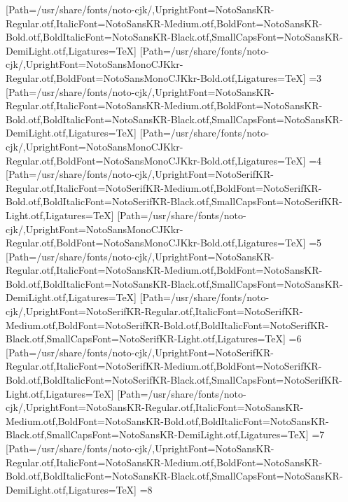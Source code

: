 [Path=/usr/share/fonts/noto-cjk/,UprightFont=NotoSansKR-Regular.otf,ItalicFont=NotoSansKR-Medium.otf,BoldFont=NotoSansKR-Bold.otf,BoldItalicFont=NotoSansKR-Black.otf,SmallCapsFont=NotoSansKR-DemiLight.otf,Ligatures=TeX]
[Path=/usr/share/fonts/noto-cjk/,UprightFont=NotoSansMonoCJKkr-Regular.otf,BoldFont=NotoSansMonoCJKkr-Bold.otf,Ligatures=TeX]
\else\ifnum\value{CJKFonts}=3
[Path=/usr/share/fonts/noto-cjk/,UprightFont=NotoSansKR-Regular.otf,ItalicFont=NotoSansKR-Medium.otf,BoldFont=NotoSansKR-Bold.otf,BoldItalicFont=NotoSansKR-Black.otf,SmallCapsFont=NotoSansKR-DemiLight.otf,Ligatures=TeX]
[Path=/usr/share/fonts/noto-cjk/,UprightFont=NotoSansMonoCJKkr-Regular.otf,BoldFont=NotoSansMonoCJKkr-Bold.otf,Ligatures=TeX]
\else\ifnum\value{CJKFonts}=4
[Path=/usr/share/fonts/noto-cjk/,UprightFont=NotoSerifKR-Regular.otf,ItalicFont=NotoSerifKR-Medium.otf,BoldFont=NotoSerifKR-Bold.otf,BoldItalicFont=NotoSerifKR-Black.otf,SmallCapsFont=NotoSerifKR-Light.otf,Ligatures=TeX]
[Path=/usr/share/fonts/noto-cjk/,UprightFont=NotoSansMonoCJKkr-Regular.otf,BoldFont=NotoSansMonoCJKkr-Bold.otf,Ligatures=TeX]
\else\ifnum\value{CJKFonts}=5
[Path=/usr/share/fonts/noto-cjk/,UprightFont=NotoSansKR-Regular.otf,ItalicFont=NotoSansKR-Medium.otf,BoldFont=NotoSansKR-Bold.otf,BoldItalicFont=NotoSansKR-Black.otf,SmallCapsFont=NotoSansKR-DemiLight.otf,Ligatures=TeX]
[Path=/usr/share/fonts/noto-cjk/,UprightFont=NotoSerifKR-Regular.otf,ItalicFont=NotoSerifKR-Medium.otf,BoldFont=NotoSerifKR-Bold.otf,BoldItalicFont=NotoSerifKR-Black.otf,SmallCapsFont=NotoSerifKR-Light.otf,Ligatures=TeX]
\else\ifnum\value{CJKFonts}=6
[Path=/usr/share/fonts/noto-cjk/,UprightFont=NotoSerifKR-Regular.otf,ItalicFont=NotoSerifKR-Medium.otf,BoldFont=NotoSerifKR-Bold.otf,BoldItalicFont=NotoSerifKR-Black.otf,SmallCapsFont=NotoSerifKR-Light.otf,Ligatures=TeX]
[Path=/usr/share/fonts/noto-cjk/,UprightFont=NotoSansKR-Regular.otf,ItalicFont=NotoSansKR-Medium.otf,BoldFont=NotoSansKR-Bold.otf,BoldItalicFont=NotoSansKR-Black.otf,SmallCapsFont=NotoSansKR-DemiLight.otf,Ligatures=TeX]
\else\ifnum\value{CJKFonts}=7
[Path=/usr/share/fonts/noto-cjk/,UprightFont=NotoSansKR-Regular.otf,ItalicFont=NotoSansKR-Medium.otf,BoldFont=NotoSansKR-Bold.otf,BoldItalicFont=NotoSansKR-Black.otf,SmallCapsFont=NotoSansKR-DemiLight.otf,Ligatures=TeX]
\else\ifnum\value{CJKFonts}=8
